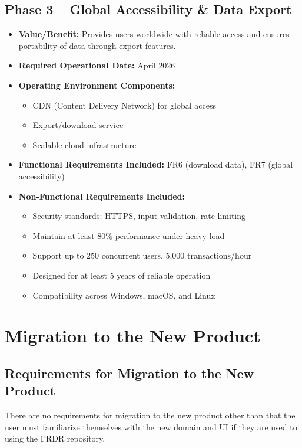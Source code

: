 \documentclass[12pt]{article}
\begin{document}
\subsection*{Phase 3 -- Global Accessibility \& Data Export}
\begin{itemize}
    \item \textbf{Value/Benefit:} Provides users worldwide with reliable access and ensures portability of data through export features.
    \item \textbf{Required Operational Date:} April 2026
    \item \textbf{Operating Environment Components:}
    \begin{itemize}
        \item CDN (Content Delivery Network) for global access
        \item Export/download service
        \item Scalable cloud infrastructure
    \end{itemize}
    \item \textbf{Functional Requirements Included:} FR6 (download data), FR7 (global accessibility)
    \item \textbf{Non-Functional Requirements Included:}
    \begin{itemize}
        \item Security standards: HTTPS, input validation, rate limiting
        \item Maintain at least 80\% performance under heavy load
        \item Support up to 250 concurrent users, 5,000 transactions/hour
        \item Designed for at least 5 years of reliable operation
        \item Compatibility across Windows, macOS, and Linux
    \end{itemize}
\end{itemize}


\section{Migration to the New Product}
\subsection{Requirements for Migration to the New Product}

\par{There are no requirements for migration to the new product other than that the user must familiarize themselves with the new domain and UI if they are used to using the FRDR repository.}
\end{document}
